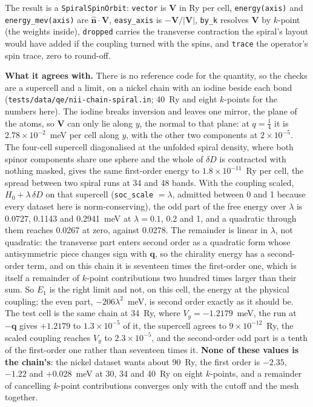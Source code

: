 \documentclass[11pt,a4paper]{article}
\newcommand{\code}[1]{\texttt{\small #1}}
\begin{document}
The result is a \code{SpiralSpinOrbit}: \code{vector} is $\mathbf V$ in Ry per
cell, \code{energy(axis)} and \code{energy\_mev(axis)} are $\hat{\mathbf
n}\cdot\mathbf V$, \code{easy\_axis} is $-\mathbf V/|\mathbf V|$, \code{by\_k}
resolves $\mathbf V$ by $k$-point (the weights inside), \code{dropped} carries the
transverse contraction the spiral's layout would have added if the coupling
turned with the spins, and \code{trace} the operator's spin trace, zero to
round-off.

\textbf{What it agrees with.} There is no reference code for the quantity, so the
checks are a supercell and a limit, on a nickel chain with an iodine beside each
bond (\code{tests/data/qe/nii-chain-spiral.in}; 40~Ry and eight $k$-points for
the numbers here). The iodine breaks inversion and leaves one mirror, the plane
of the atoms, so $\mathbf V$ can only lie along $y$, the normal to that plane: at
$q = \tfrac14$ it is $2.78\times10^{-2}$~meV per cell along $y$, with the other two
components at $2\times10^{-5}$. The four-cell supercell diagonalised at the
unfolded spiral density, where both spinor components share one sphere and the
whole of $\delta D$ is contracted with nothing masked, gives the same first-order
energy to $1.8\times10^{-11}$~Ry per cell, the spread between two spiral runs at
34 and 48 bands. With the coupling scaled, $H_0 + \lambda\,\delta D$ on that
supercell (\code{soc\_scale} $=\lambda$, admitted between 0 and 1 because every
dataset here is norm-conserving), the odd part of the free energy over $\lambda$ is 0.0727, 0.1143 and
0.2941~meV at $\lambda = 0.1$, 0.2 and 1, and a quadratic through them reaches
0.0267 at zero, against 0.0278. The remainder is linear in $\lambda$, not
quadratic: the transverse part enters second order as a quadratic form whose
antisymmetric piece changes sign with $\mathbf q$, so the chirality energy has a
second-order term, and on this chain it is seventeen times the first-order one,
which is itself a remainder of $k$-point contributions two hundred times larger
than their sum. So $E_1$ is the right limit and not, on this cell, the energy at
the physical coupling; the even part, $-206\lambda^2$~meV, is second order
exactly as it should be. The test cell is the same chain at 34~Ry, where
$V_y = -1.2179$~meV, the run at $-\mathbf q$ gives $+1.2179$ to $1.3\times10^{-5}$
of it, the supercell agrees to $9\times10^{-12}$~Ry, the scaled coupling reaches
$V_y$ to $2.3\times10^{-5}$, and the second-order odd part is a tenth of the
first-order one rather than seventeen times it. \textbf{None of these values is
the chain's}: the nickel dataset wants about 90~Ry, the first order is
$-2.35$, $-1.22$ and $+0.028$~meV at 30, 34 and 40~Ry on eight $k$-points, and a
remainder of cancelling $k$-point contributions converges only with the cutoff
and the mesh together.
\end{document}
